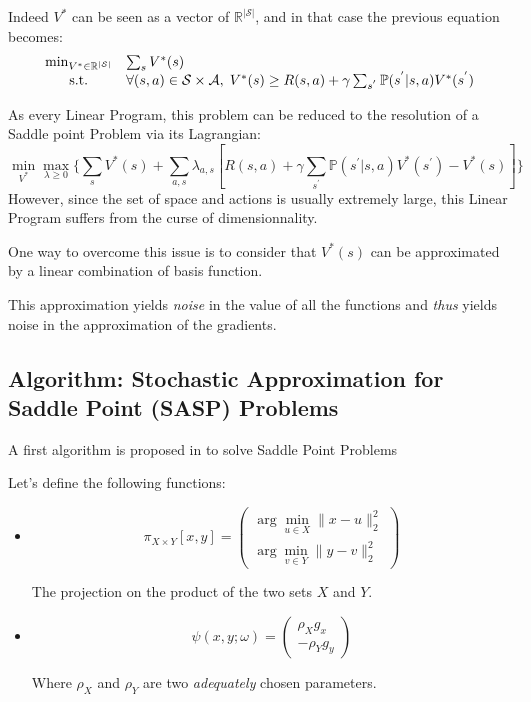 \documentclass[12pt,reqno]{amsart}
\numberwithin{equation}{section}
\begin{document}
Indeed $V^{*}$ can be seen as a vector of $\mathbb{R}^{|\mathcal{S}|}$, and in that case the previous equation becomes:
\begin{equation}\label{MLSDP}
\begin{array}{cl}
\min_{V^{*} \in \mathbb{R}^{|\mathcal{S}|}} & \sum_{s} V^{*}(s)  \\
\text{s.t.} & \forall (s, a)\in \mathcal{S} \times \mathcal{A}, \hspace{0.1cm} V^{*}(s) \geq R(s,a) + \gamma \sum_{s^{'}}\mathbb{P}(s^{'}| s,a )V^{*}(s^{'})\\
\end{array}
\end{equation}

As every Linear Program, this problem can be reduced to the resolution of a Saddle point Problem via its Lagrangian:
$$
\min_{V^{*}}\max_{\lambda \geq 0}\{ \sum_{s} V^{*}(s) + \sum_{a,s}\lambda_{a,s}[R(s,a) + \gamma \sum_{s^{'}}\mathbb{P}(s^{'}| s,a )V^{*}(s^{'}) - V^{*}(s)] \}
$$
However, since the set of space and actions is usually extremely large, this Linear Program suffers from the curse of dimensionnality.

One way to overcome this issue is to consider that $V^{*}(s)$ can be approximated by a linear combination of basis function.

This approximation yields \emph{noise} in the value of all the functions and \emph{thus} yields noise in the approximation of the gradients.



\subsection{Algorithm: Stochastic Approximation for Saddle Point (SASP) Problems}

A first algorithm is proposed in \cite{NemirovskiRubinstein} to solve Saddle Point Problems


Let's define the following functions:
\begin{itemize}
\item $$\pi_{X \times Y}[x,y] = \begin{pmatrix} \arg\min_{u \in X}\lVert x - u \rVert_{2}^{2} \\ \arg\min_{v \in Y}\lVert y - v \rVert_{2}^{2} \end{pmatrix}$$

The projection on the product of the two sets $X$ and $Y$.

\item $$\psi(x,y;\omega) = \begin{pmatrix} \rho_{X} g_{x} \\ -\rho_{Y} g_{y}  \end{pmatrix}$$

Where $\rho_{X}$ and $\rho_{Y}$ are two \emph{adequately} chosen parameters.

\end{itemize}
\end{document}

